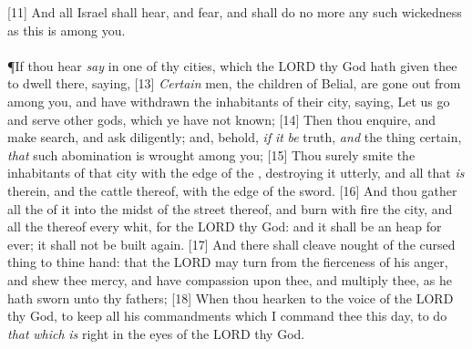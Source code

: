 [11] \textcolor[cmyk]{0.99998,1,0,0}{And all Israel shall hear, and fear, and shall do no more any such wickedness as this is among you.}\\
\\
\P \textcolor[cmyk]{0.99998,1,0,0}{If thou  hear \emph{say} in one of thy cities, which the LORD thy God hath given thee to dwell there, saying,}
[13] \textcolor[cmyk]{0.99998,1,0,0}{\emph{Certain} men, the children of Belial, are gone out from among you, and have withdrawn the inhabitants of their city, saying, Let us go and serve other gods, which ye have not known;}
[14] \textcolor[cmyk]{0.99998,1,0,0}{Then  thou enquire, and make search, and ask diligently; and, behold, \emph{if} \emph{it} \emph{be} truth, \emph{and} the thing certain, \emph{that} such abomination is wrought among you;}
[15] \textcolor[cmyk]{0.99998,1,0,0}{Thou  surely smite the inhabitants of that city with the edge of the , destroying it utterly, and all that \emph{is} therein, and the cattle thereof, with the edge of the sword.}
[16] \textcolor[cmyk]{0.99998,1,0,0}{And thou  gather all the  of it into the midst of the street thereof, and  burn with fire the city, and all the  thereof every whit, for the LORD thy God: and it shall be an heap for ever; it shall not be built again.}
[17] \textcolor[cmyk]{0.99998,1,0,0}{And there shall cleave nought of the cursed thing to thine hand: that the LORD may turn from the fierceness of his anger, and shew thee mercy, and have compassion upon thee, and multiply thee, as he hath sworn unto thy fathers;}
[18] \textcolor[cmyk]{0.99998,1,0,0}{When thou  hearken to the voice of the LORD thy God, to keep all his commandments which I command thee this day, to do \emph{that} \emph{which} \emph{is} right in the eyes of the LORD thy God.}
